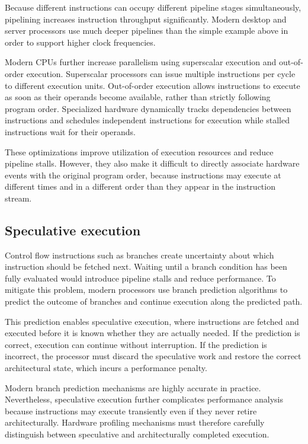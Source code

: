 Because different instructions can occupy different pipeline stages simultaneously, pipelining increases instruction throughput significantly\cite[C.1]{Hennessy2011}. Modern desktop and server processors use much deeper pipelines than the simple example above in order to support higher clock frequencies\cite{Cohen2024,W1zzard2025,Bruce}.

Modern CPUs further increase parallelism using superscalar execution and out-of-order execution. Superscalar processors can issue multiple instructions per cycle to different execution units. Out-of-order execution allows instructions to execute as soon as their operands become available, rather than strictly following program order\cite[3.4]{Hennessy2011}. Specialized hardware dynamically tracks dependencies between instructions and schedules independent instructions for execution while stalled instructions wait for their operands.

These optimizations improve utilization of execution resources and reduce pipeline stalls. However, they also make it difficult to directly associate hardware events with the original program order, because instructions may execute at different times and in a different order than they appear in the instruction stream.

\subsection{Speculative execution}

Control flow instructions such as branches create uncertainty about which instruction should be fetched next. Waiting until a branch condition has been fully evaluated would introduce pipeline stalls and reduce performance. To mitigate this problem, modern processors use branch prediction algorithms to predict the outcome of branches and continue execution along the predicted path.\cite[3.6]{Hennessy2011}

This prediction enables speculative execution, where instructions are fetched and executed before it is known whether they are actually needed. If the prediction is correct, execution can continue without interruption. If the prediction is incorrect, the processor must discard the speculative work and restore the correct architectural state, which incurs a performance penalty\cite[3.9]{Hennessy2011}.

Modern branch prediction mechanisms are highly accurate in practice\cite{Lam2021,Mittal2018}. Nevertheless, speculative execution further complicates performance analysis because instructions may execute transiently even if they never retire architecturally. Hardware profiling mechanisms must therefore carefully distinguish between speculative and architecturally completed execution.

